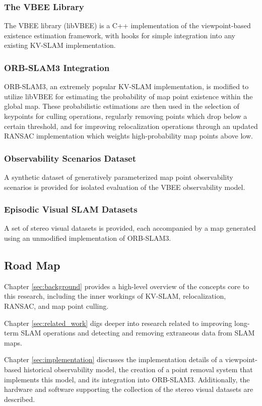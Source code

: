 \subsubsection{The VBEE Library}
The VBEE library (libVBEE) is a C++ implementation of the viewpoint-based existence estimation framework, with hooks for simple integration into any existing KV-SLAM implementation.

\subsubsection{ORB-SLAM3 Integration}
ORB-SLAM3, an extremely popular KV-SLAM implementation, is modified to utilize libVBEE for estimating the probability of map point existence within the global map. These probabilistic estimations are then used in the selection of keypoints for culling operations, regularly removing points which drop below a certain threshold, and for improving relocalization operations through an updated RANSAC implementation which weights high-probability map points above low.

\subsubsection{Observability Scenarios Dataset}
A synthetic dataset of generatively parameterized map point observability scenarios is provided for isolated evaluation of the VBEE observability model.

\subsubsection{Episodic Visual SLAM Datasets}
A set of stereo visual datasets is provided, each accompanied by a map generated using an unmodified implementation of ORB-SLAM3.

\subsection{Road Map}

Chapter \ref{sec:background} provides a high-level overview of the concepts core to this research, including the inner workings of KV-SLAM, relocalization, RANSAC, and map point culling.

Chapter \ref{sec:related_work} digs deeper into research related to improving long-term SLAM operations and detecting and removing extraneous data from SLAM maps.

Chapter \ref{sec:implementation} discusses the implementation details of a viewpoint-based historical observability model, the creation of a point removal system that implements this model, and its integration into ORB-SLAM3. Additionally, the hardware and software supporting the collection of the stereo visual datasets are described.

